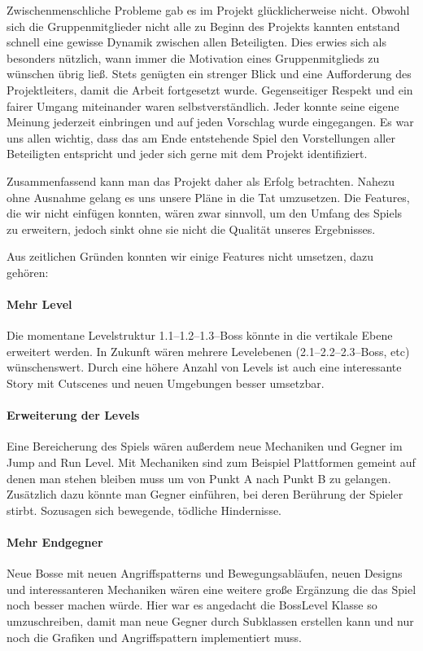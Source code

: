 Zwischenmenschliche Probleme gab es im Projekt glücklicherweise nicht. Obwohl sich die Gruppenmitglieder nicht alle zu Beginn des Projekts kannten entstand schnell eine gewisse Dynamik zwischen allen Beteiligten. Dies erwies sich als besonders nützlich, wann immer die Motivation eines Gruppenmitglieds zu wünschen übrig ließ. Stets genügten ein strenger Blick und eine Aufforderung des Projektleiters, damit die Arbeit fortgesetzt wurde.
Gegenseitiger Respekt und ein fairer Umgang miteinander waren selbstverständlich. Jeder konnte seine eigene Meinung jederzeit einbringen und auf jeden Vorschlag wurde eingegangen. Es war uns allen wichtig, dass das am Ende entstehende Spiel den Vorstellungen aller Beteiligten entspricht und jeder sich gerne mit dem Projekt identifiziert.


Zusammenfassend kann man das Projekt daher als Erfolg betrachten. Nahezu ohne Ausnahme gelang es uns unsere Pläne in die Tat umzusetzen. Die Features, die wir nicht einfügen konnten, wären zwar sinnvoll, um den Umfang des Spiels zu erweitern, jedoch sinkt ohne sie nicht die Qualität unseres Ergebnisses.  

\label{sec:6_Features}

Aus zeitlichen Gründen konnten wir einige Features nicht umsetzen, dazu gehören:

\paragraph{Mehr Level}
Die momentane Levelstruktur 1.1--1.2--1.3--Boss könnte in die vertikale Ebene erweitert werden. In Zukunft wären mehrere Levelebenen (2.1--2.2--2.3--Boss, etc) wünschenswert. Durch eine höhere Anzahl von Levels ist auch eine interessante Story mit Cutscenes und neuen Umgebungen besser umsetzbar. 

\paragraph{Erweiterung der Levels}
Eine Bereicherung des Spiels wären außerdem neue Mechaniken und Gegner im Jump and Run Level. Mit Mechaniken sind zum Beispiel Plattformen gemeint auf denen man stehen bleiben muss um von Punkt A nach Punkt B zu gelangen. Zusätzlich dazu könnte man Gegner einführen, bei deren Berührung der Spieler stirbt. Sozusagen sich bewegende, tödliche Hindernisse.

\paragraph{Mehr Endgegner}
Neue Bosse mit neuen Angriffspatterns und Bewegungsabläufen, neuen Designs und interessanteren Mechaniken wären eine weitere große Ergänzung die das Spiel noch besser machen würde. Hier war es angedacht die BossLevel Klasse so umzuschreiben, damit man neue Gegner durch Subklassen erstellen kann und nur noch die Grafiken und Angriffspattern implementiert muss.

